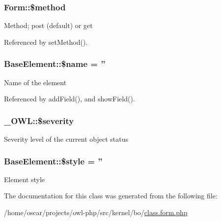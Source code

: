 \subsubsection[{\$method}]{\setlength{\rightskip}{0pt plus 5cm}Form::\$method}\label{classForm_a3ca31ec7032a41b95c94de22a850672c}
Method; post (default) or get 

Referenced by setMethod().

\subsubsection[{\$name}]{\setlength{\rightskip}{0pt plus 5cm}BaseElement::\$name = ''}\label{classBaseElement_a30b8cff187a9de659a70daf287d66f45}
Name of the element 

Referenced by addField(), and showField().

\subsubsection[{\$severity}]{\setlength{\rightskip}{0pt plus 5cm}\_\-OWL::\$severity}\label{class__OWL_ad26b40a9dbbacb33e299b17826f8327c}
Severity level of the current object status 
\subsubsection[{\$style}]{\setlength{\rightskip}{0pt plus 5cm}BaseElement::\$style = ''}\label{classBaseElement_a429a3d642dd95f30e1059ef29564b87d}
Element style 

The documentation for this class was generated from the following file:\begin{DoxyCompactItemize}
\item 
/home/oscar/projects/owl-\/php/src/kernel/bo/\hyperlink{class_8form_8php}{class.form.php}\end{DoxyCompactItemize}
